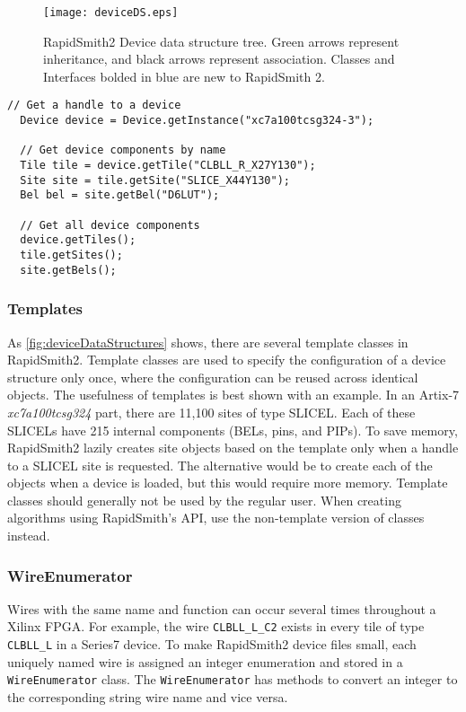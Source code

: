 \begin{figure}[t]
	\centering
	\texttt{[image: deviceDS.eps]}
	\caption{RapidSmith2 Device data structure tree. Green arrows
	represent inheritance, and black arrows represent association. Classes and Interfaces
	bolded in blue are new to RapidSmith 2.}
	\label{fig:deviceDataStructures}
\end{figure}

\begin{lstlisting}[xleftmargin=1.5em, framexleftmargin=1.5em, caption=Basic
device function calls, label=lst:deviceCalls]
  // Get a handle to a device 
  Device device = Device.getInstance("xc7a100tcsg324-3");
	
  // Get device components by name
  Tile tile = device.getTile("CLBLL_R_X27Y130");
  Site site = tile.getSite("SLICE_X44Y130");
  Bel bel = site.getBel("D6LUT");
	
  // Get all device components
  device.getTiles();
  tile.getSites();
  site.getBels();
\end{lstlisting}

\subsubsection{Templates}
As \autoref{fig:deviceDataStructures} shows, there are several template
classes in RapidSmith2. Template classes are used to specify the configuration
of a device structure only once, where the configuration can be reused
across identical objects. The usefulness of templates is best shown with an
example. In an Artix-7 \emph{xc7a100tcsg324} part, there are 11,100 sites of
type SLICEL. Each of these SLICELs have 215 internal components (BELs, pins,
and PIPs). To save memory, RapidSmith2 lazily creates site objects
based on the template only when a handle to a SLICEL site is requested. The
alternative would be to create each of the objects when a device is loaded, but
this would require more memory. Template classes should generally not be
used by the regular user. When creating algorithms using RapidSmith's API, use
the non-template version of classes instead.

\subsubsection{WireEnumerator} \label{wireEnum}
Wires with the same name and function can occur several times throughout a
Xilinx FPGA. For example, the wire \texttt{CLBLL\-\_L\_C2} exists in every tile
of type \texttt{CLBLL\_L} in a Series7 device. To make RapidSmith2
device files small, each uniquely named wire is assigned an integer enumeration
and stored in a \texttt{WireEnumerator} class. The \texttt{WireEnum\-erator}
has methods to convert an integer to the corresponding string wire name and
vice versa.

